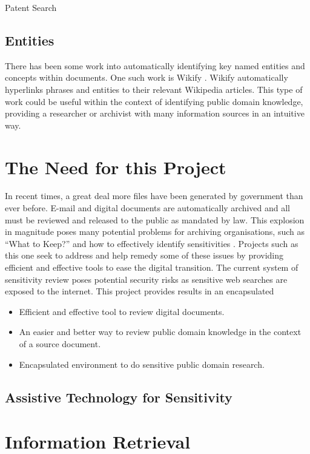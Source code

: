 \documentclass{l4proj}
\begin{document}
Patent Search
\subsection{Entities}
There has been some work into automatically identifying key named entities and concepts within documents. One such work is Wikify \cite{Mihalcea:2007:WLD:1321440.1321475}. Wikify automatically hyperlinks phrases and entities to their relevant Wikipedia articles. This type of work could be useful within the context of identifying public domain knowledge, providing a researcher or archivist with many information sources in an intuitive way.

\section{The Need for this Project}
In recent times, a great deal more files have been generated by government than ever before. E-mail and digital documents are automatically archived and all must be reviewed and released to the public as mandated by law. This explosion in magnitude poses many potential problems for archiving organisations, such as ``What to Keep?'' and how to effectively identify sensitivities \cite{moss2012have}. 
Projects such as this one seek to address and help remedy some of these issues by providing efficient and effective tools to ease the digital transition.
The current system of sensitivity review poses potential security risks as sensitive web searches are exposed to the internet. This project provides results in an encapsulated
\begin{itemize}
\item Efficient and effective tool to review digital documents.
\item An easier and better way to review public domain knowledge in the context of a source document.
\item Encapsulated environment to do sensitive public domain research.
\end{itemize}

\subsection{Assistive Technology for Sensitivity}

\section{Information Retrieval}
\end{document}
